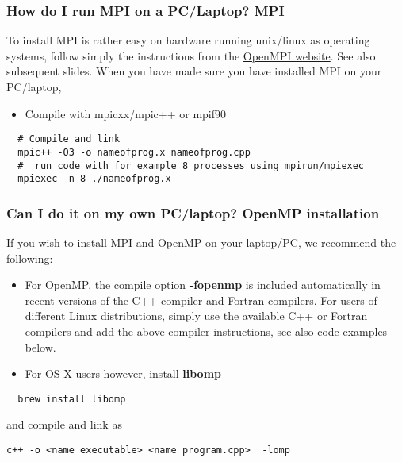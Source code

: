 \documentclass{beamer}
\begin{document}
\begin{frame}
\frametitle{How do I run MPI on a PC/Laptop? MPI}

\begin{block}{}
To install MPI is rather easy on hardware running unix/linux as operating systems, follow simply the instructions from the \href{{https://www.open-mpi.org/}}{OpenMPI website}. See also subsequent slides.
When you have made sure you have installed MPI on your PC/laptop, 
\begin{itemize}
\item Compile with mpicxx/mpic++ or mpif90
\end{itemize}

\noindent





\begin{verbatim}
  # Compile and link
  mpic++ -O3 -o nameofprog.x nameofprog.cpp
  #  run code with for example 8 processes using mpirun/mpiexec
  mpiexec -n 8 ./nameofprog.x

\end{verbatim}

\end{block}
\end{frame}

\begin{frame}
\frametitle{Can I do it on my own PC/laptop? OpenMP installation}

\begin{block}{}
If you wish to install MPI and OpenMP 
on your laptop/PC, we recommend the following:

\begin{itemize}
\item For OpenMP, the compile option \textbf{-fopenmp} is included automatically in recent versions of the C++ compiler and Fortran compilers. For users of different Linux distributions, simply use the available C++ or Fortran compilers and add the above compiler instructions, see also code examples below.

\item For OS X users however, install \textbf{libomp}
\end{itemize}

\noindent


\begin{verbatim}
  brew install libomp

\end{verbatim}

and compile and link as


\begin{verbatim}
c++ -o <name executable> <name program.cpp>  -lomp

\end{verbatim}


\end{block}
\end{frame}
\end{document}
